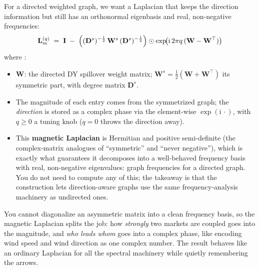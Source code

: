 For a directed weighted graph, we want a Laplacian that keeps the direction information but still has an orthonormal eigenbasis and real, non-negative frequencies:
\begin{equation}\label{eq:gnn:magnetic}
  \mathbf{L}^{(q)}_{m} \;=\; \mathbf{I} \;-\; \Bigl( (\mathbf{D}^{s})^{-\frac{1}{2}}\, \mathbf{W}^{s}\, (\mathbf{D}^{s})^{-\frac{1}{2}} \Bigr) \odot \exp\!\bigl( \mathrm{i}\, 2\pi q\, (\mathbf{W} - \mathbf{W}^{\top}) \bigr)
\end{equation}
where \citep[eqs.~6--9, pp.~11--12]{ChiGaoWang2024GSP}:
\begin{itemize}[nosep]
  \item $\mathbf{W}$: the directed DY spillover weight matrix; $\mathbf{W}^{s} = \tfrac{1}{2}(\mathbf{W} + \mathbf{W}^{\top})$ its symmetric part, with degree matrix $\mathbf{D}^{s}$.
  \item The magnitude of each entry comes from the symmetrized graph; the \emph{direction} is stored as a complex phase via the element-wise $\exp(\mathrm{i}\,\cdot)$, with $q \ge 0$ a tuning knob ($q = 0$ throws the direction away).
  \item This \textbf{magnetic Laplacian} is Hermitian and positive semi-definite (the complex-matrix analogues of ``symmetric'' and ``never negative''), which is exactly what guarantees it decomposes into a well-behaved frequency basis with real, non-negative eigenvalues: graph frequencies for a directed graph. You do not need to compute any of this; the takeaway is that the construction lets direction-aware graphs use the same frequency-analysis machinery as undirected ones.
\end{itemize}

\begin{intuition}
You cannot diagonalize an asymmetric matrix into a clean frequency basis, so the magnetic Laplacian splits the job: how \emph{strongly} two markets are coupled goes into the magnitude, and \emph{who leads whom} goes into a complex phase, like encoding wind speed and wind direction as one complex number. The result behaves like an ordinary Laplacian for all the spectral machinery while quietly remembering the arrows.
\end{intuition}

